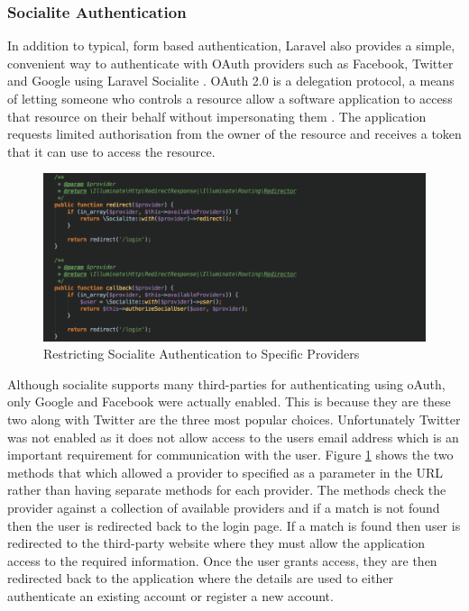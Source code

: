\subsubsection{Socialite Authentication}
In addition to typical, form based authentication, Laravel also provides a simple, convenient way to authenticate with OAuth providers such as Facebook, Twitter and Google using Laravel Socialite \cite{Laravel:Authentication}. OAuth 2.0 is a delegation protocol, a means of letting someone who controls a resource allow a software application to access that resource on their behalf without impersonating them \cite{OAuth2inAction}. The application requests limited authorisation from the owner of the resource and receives a token that it can use to access the resource.

\begin{figure}[H]
	\centering
	\includegraphics[width=1.0\textwidth]{images/Code/Socialite_Routes}
	\caption{Restricting Socialite Authentication to Specific Providers} \label{fig:Socialite_Routes}
\end{figure}

Although socialite supports many third-parties for authenticating using oAuth, only Google and Facebook were actually enabled. This is because they are these two along with Twitter are the three most popular choices. Unfortunately Twitter was not enabled as it does not allow access to the users email address which is an important requirement for communication with the user. Figure \ref{fig:Socialite_Routes} shows the two methods that which allowed a provider to specified as a parameter in the URL rather than having separate methods for each provider. The methods check the provider against a collection of available providers and if a match is not found then the user is redirected back to the login page. If a match is found then user is redirected to the third-party website where they must allow the application access to the required information. Once the user grants access, they are then redirected back to the application where the details are used to either authenticate an existing account or register a new account.

